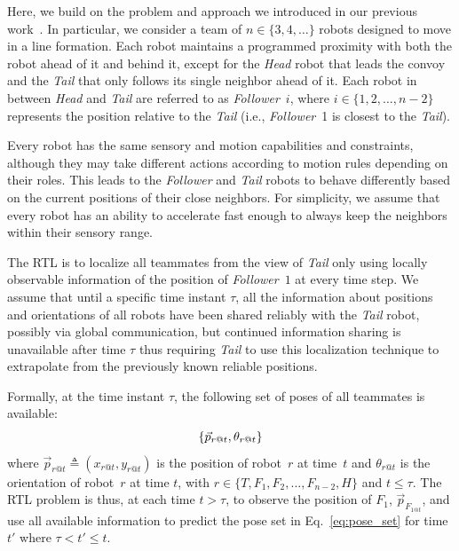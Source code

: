 \documentclass[letterpaper, 10 pt, conference]{ieeeconf}  %
\begin{document}
    Here, we build on the problem and approach we introduced in our previous
    work~\cite{CPR17}. In particular, we consider a team of $n \in
    \{3,4,\dots\}$ robots designed to move in a line formation.
    Each robot maintains a programmed
    proximity with both the robot ahead of it and behind it, except for
    the \emph{Head} robot that leads the convoy and the \emph{Tail}
    that only follows its single neighbor ahead of it. Each robot in
    between \emph{Head} and \emph{Tail} are referred to as
    \emph{Follower}~$i$, where $i \in \{1, 2, \dots, n-2\}$ represents
    the position relative to the \emph{Tail} (i.e., \emph{Follower}~1 is
    closest to the \emph{Tail}).

    Every robot has the same sensory and motion capabilities and
    constraints, although they may take different actions according to
    motion rules depending on their roles. This leads to the
    \emph{Follower} and \emph{Tail} robots to behave differently based
    on the current positions of their close neighbors. For simplicity,
    we assume that every robot has an ability to accelerate fast enough
    to always keep the neighbors within their sensory range.

    The RTL is to localize all teammates from the view of \emph{Tail}
    only using locally observable information of the position
    of \emph{Follower}~$1$ at every time step. We assume that until a
    specific time instant $\tau$, all the information about positions
    and orientations of all robots have been shared reliably with the
    \emph{Tail} robot, possibly via global communication, but continued
    information sharing is unavailable after time $\tau$ thus requiring
    \emph{Tail} to use this localization technique to extrapolate from
    the previously known reliable positions.

    Formally, at the time instant $\tau$, the following set of poses of
    all teammates is available:
	\begin{equation}
		\{\vec{p}_{r@t},\theta_{r@t}\} \\
	    \label{eq:pose_set}
	\end{equation}
    where $\vec{p}_{r@t} \triangleq (x_{r@t}, y_{r@t})$ is the position
    of robot~$r$ at time~$t$ and $\theta_{r@t}$ is the orientation of
    robot~$r$ at time $t$, with $r \in \{T, F_{1}, F_{2}, ..., F_{n-2},
    H\}$ and $t \leq \tau$. The RTL problem is thus, at each time $t >
    \tau$, to observe the position of $F_1$, $\vec{p}_{F_{1@t}}$, and
    use all available information to predict the pose set in
    Eq.~\eqref{eq:pose_set} for time $t'$ where $ \tau < t' \leq t$.
\end{document}
